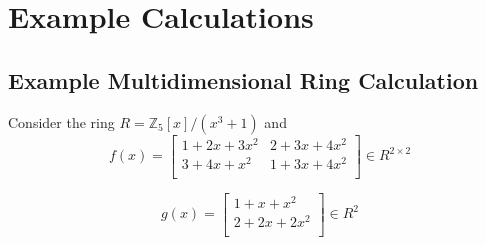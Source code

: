 \chapter{Example Calculations}

\section{Example Multidimensional Ring Calculation}
\label{app:ExampleMultiRingCalc}

Consider the ring $R = \mathbb{Z}_5[x]/(x^3+1)$ and 
$$
  f(x) =\begin{bmatrix}
    1+2x+3x^2 & 2+3x+4x^2 \\
    3+4x+x^2  & 1+3x+4x^2 \\
  \end{bmatrix} \in R^{2\times 2}
$$

$$
  g(x) = \begin{bmatrix}
    1+x+x^2   \\
    2+2x+2x^2 \\
  \end{bmatrix} \in R^2
$$

